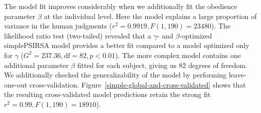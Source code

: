 \documentclass[10pt,a4paper]{article}
\begin{document}

 

The model fit improves considerably when we additionally fit the obedience parameter $\beta$ at the individual level. 
Here the model explains a large proportion of variance in the human judgments ($r^2 = 0.9919, F(1,190) = 23480$). The likelihood ratio test (two-tailed) revealed that a $\gamma$- and $\beta$-optimized simplePSIRSA model provides a better fit compared to a model optimized only for $\gamma$ ($G^2 = 237.36, \textrm{df} = 82, p < 0.01$). The more complex model contains one additional parameter $\beta$ fitted for each subject, giving us 82 degrees of freedom. We additionally checked the generalizability of the model by performing leave-one-out cross-validation. Figure~\ref{simple-global-and-cross-validated} shows that the resulting cross-validated model predictions retain the strong fit $r^2 = 0.99, F(1,190) = 18910$).

\end{document}
